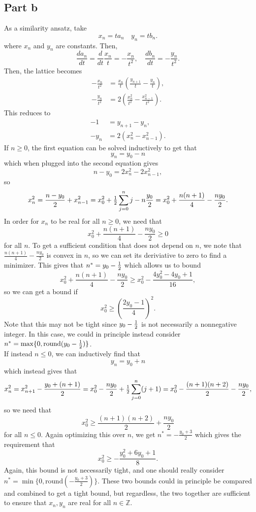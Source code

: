 \documentclass{article}
\begin{document}
\subsection{Part b}
As a similarity ansatz, take 
\[
x_n=ta_n\quad y_n=tb_n.
\]
where $x_n$ and $y_n$ are constants. Then,
\[
\frac{da_n}{dt}=\frac{d}{dt}\frac{x_n}{t}=-\frac{x_n}{t^2},\quad\frac{db_n}{dt}=-\frac{y_n}{t^2}.
\]
Then, the lattice becomes
\begin{align*}
	-\frac{x_n}{t^2}&=\frac{x_n}{t}\left(\frac{y_{n+1}}{t}-\frac{y_n}{t}\right),\\
	-\frac{y_n}{t^2}&=2\left(\frac{x_n^2}{t^2}-\frac{x_{n-1}^2}{t^2}\right).
\end{align*}
This reduces to
\begin{align*}
	-1&=y_{n+1}-y_n,\\
	-y_n&=2\left(x_n^2-x_{n-1}^2\right).
\end{align*}
If $n\geq0$, the first equation can be solved inductively to get that
\[
y_n=y_0-n
\]
which when plugged into the second equation gives
\[
n-y_0=2x_n^2-2x_{n-1}^2,
\]
so 
\[
x_n^2=\frac{n-y_0}{2}+x_{n-1}^2=x_0^2+\mbox{$\frac{1}{2}$}\sum_{j=0}^{n}j-n\frac{y_0}{2}=x_0^2+\frac{n(n+1)}{4}-\frac{ny_0}{2}.
\]
In order for $x_n$ to be real for all $n\geq0$, we need that 
\[
x_0^2+\frac{n(n+1)}{4}-\frac{ny_0}{2}\geq0
\]
for all $n$. To get a sufficient condition that does not depend on $n$, we note that $\frac{n(n+1)}{4}-\frac{ny_0}{2}$ is convex in $n$, so we can set its deriviative to zero to find a minimizer. This gives that $n^*=y_0-\mbox{$\frac{1}{2}$}$ which allows us to bound 
\[
x_0^2+\frac{n(n+1)}{4}-\frac{ny_0}{2}\geq x_0^2-\frac{4y_0^2-4y_0+1}{16},
\]
so we can get a bound if 
\[
x_0^2\geq\left(\frac{2y_0-1}{4}\right)^2.
\]
Note that this may not be tight since $y_0-\mbox{$\frac{1}{2}$}$ is not necessarily a nonnegative integer. In this case, we could in principle instead consider $n^*=\max\{0,\text{round}(y_0-\mbox{$\frac{1}{2}$})\}$.\\
If instead $n\leq0$, we can inductively find that 
\[
y_n=y_0+n
\]
which instead gives that
\[
x_n^2=x_{n+1}^2-\frac{y_0+(n+1)}{2}=x_0^2-\frac{ny_0}{2}+\mbox{$\frac{1}{2}$}\sum_{j=0}^n(j+1)=x_0^2-\frac{(n+1)(n+2)}{2}-\frac{ny_0}{2},
\]
so we need that 
\[
x_0^2\geq\frac{(n+1)(n+2)}{2}+\frac{ny_0}{2}
\]
for all $n\leq0$. Again optimizing this over $n$, we get $n^*=-\frac{y_0+3}{2}$ which gives the requirement that 
\[
x_0^2\geq-\frac{y_0^2+6y_0+1}{8}.
\]
Again, this bound is not necessarily tight, and one should really consider $n^*=\min\{0,\text{round}\left(-\frac{y_0+3}{2}\right)\}$. These two bounds could in principle be compared and combined to get a tight bound, but regardless, the two together are sufficient to ensure that $x_n,y_n$ are real for all $n\in\mathbb{Z}$.
\end{document}
